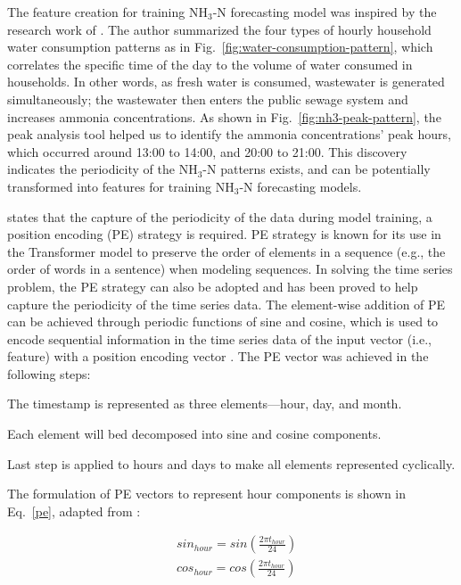 The feature creation for training NH$_{3}$-N forecasting model was inspired by the research work of \citet{abu-bakarQuantifyingImpactCOVID192021}. The author summarized the four types of hourly household water consumption patterns as in Fig.~\ref{fig:water-consumption-pattern}, which correlates the specific time of the day to the volume of water consumed in households. In other words, as fresh water is consumed, wastewater is generated simultaneously; the wastewater then enters the public sewage system and increases ammonia concentrations. As shown in Fig.~\ref{fig:nh3-peak-pattern}, the peak analysis tool helped us to identify the ammonia concentrations' peak hours, which occurred around 13:00 to 14:00, and 20:00 to 21:00. This discovery indicates the periodicity of the NH$_{3}$-N patterns exists, and can be potentially transformed into features for training NH$_{3}$-N forecasting models. 

\citet{caiTrafficTransformerCapturing2020} states that the capture of the periodicity of the data during model training, a position encoding (PE) strategy is required. 
PE strategy is known for its use in the Transformer model to preserve the order of elements in a sequence (e.g., the order of words in a sentence) when modeling sequences.
In solving the time series problem, the PE strategy can also be adopted and has been proved to help capture the periodicity of the time series data.
The element-wise addition of PE can be achieved through periodic functions of sine and cosine, which is used to encode sequential information in the time series data of the input vector (i.e., feature) with a position encoding vector \citep{wuDeepTransformerModels2020}.
The PE vector was achieved in the following steps:

\noindent
\begin{myenumerate}
    \item The timestamp is represented as three elements---hour, day, and month.
    \item Each element will bed decomposed into sine and cosine components.
    \item Last step is applied to hours and days to make all elements represented cyclically.
\end{myenumerate}

The formulation of PE vectors to represent hour components is shown in Eq.~\ref{pe}, adapted from \citep{ahmedTransformersTimeseriesAnalysis2022}:

\begin{equation}\label{pe}
  \begin{aligned}
      &sin_{hour}=sin(\frac{2 \pi t_{hour}}{24}) \\
      &cos_{hour}=cos(\frac{2 \pi t_{hour}}{24})
  \end{aligned}
\end{equation}

